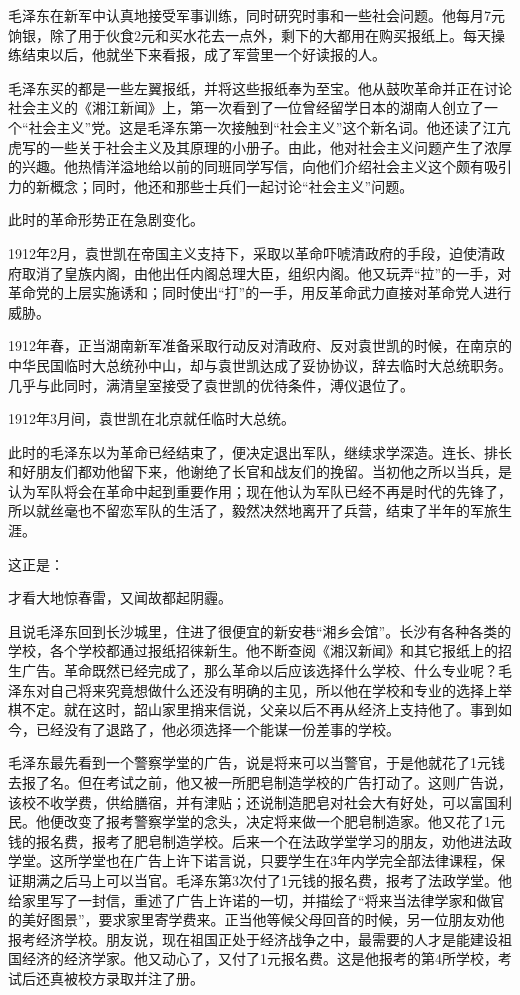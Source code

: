 \documentclass[../../dazhuan.tex]{subfiles}
\begin{document}
毛泽东在新军中认真地接受军事训练，同时研究时事和一些社会问题。他每月7元饷银，除了用于伙食2元和买水花去一点外，剩下的大都用在购买报纸上。每天操练结束以后，他就坐下来看报，成了军营里一个好读报的人。

毛泽东买的都是一些左翼报纸，并将这些报纸奉为至宝。他从鼓吹革命并正在讨论社会主义的《湘江新闻》上，第一次看到了一位曾经留学日本的湖南人创立了一个“社会主义”党。这是毛泽东第一次接触到“社会主义”这个新名词。他还读了江亢虎写的一些关于社会主义及其原理的小册子。由此，他对社会主义问题产生了浓厚的兴趣。他热情洋溢地给以前的同班同学写信，向他们介绍社会主义这个颇有吸引力的新概念；同时，他还和那些士兵们一起讨论“社会主义”问题。

此时的革命形势正在急剧变化。

1912年2月，袁世凯在帝国主义支持下，采取以革命吓唬清政府的手段，迫使清政府取消了皇族内阁，由他出任内阁总理大臣，组织内阁。他又玩弄“拉”的一手，对革命党的上层实施诱和；同时使出“打”的一手，用反革命武力直接对革命党人进行威胁。

1912年春，正当湖南新军准备采取行动反对清政府、反对袁世凯的时候，在南京的中华民国临时大总统孙中山，却与袁世凯达成了妥协协议，辞去临时大总统职务。几乎与此同时，满清皇室接受了袁世凯的优待条件，溥仪退位了。

1912年3月间，袁世凯在北京就任临时大总统。

此时的毛泽东以为革命已经结束了，便决定退出军队，继续求学深造。连长、排长和好朋友们都劝他留下来，他谢绝了长官和战友们的挽留。当初他之所以当兵，是认为军队将会在革命中起到重要作用；现在他认为军队已经不再是时代的先锋了，所以就丝毫也不留恋军队的生活了，毅然决然地离开了兵营，结束了半年的军旅生涯。

这正是：\begin{xemph}才看大地惊春雷，又闻故都起阴霾。\end{xemph}


且说毛泽东回到长沙城里，住进了很便宜的新安巷“湘乡会馆”。长沙有各种各类的学校，各个学校都通过报纸招徕新生。他不断查阅《湘汉新闻》和其它报纸上的招生广告。革命既然已经完成了，那么革命以后应该选择什么学校、什么专业呢？毛泽东对自己将来究竟想做什么还没有明确的主见，所以他在学校和专业的选择上举棋不定。就在这时，韶山家里捎来信说，父亲以后不再从经济上支持他了。事到如今，已经没有了退路了，他必须选择一个能谋一份差事的学校。

毛泽东最先看到一个警察学堂的广告，说是将来可以当警官，于是他就花了1元钱去报了名。但在考试之前，他又被一所肥皂制造学校的广告打动了。这则广告说，该校不收学费，供给膳宿，并有津贴；还说制造肥皂对社会大有好处，可以富国利民。他便改变了报考警察学堂的念头，决定将来做一个肥皂制造家。他又花了1元钱的报名费，报考了肥皂制造学校。后来一个在法政学堂学习的朋友，劝他进法政学堂。这所学堂也在广告上许下诺言说，只要学生在3年内学完全部法律课程，保证期满之后马上可以当官。毛泽东第3次付了1元钱的报名费，报考了法政学堂。他给家里写了一封信，重述了广告上许诺的一切，并描绘了“将来当法律学家和做官的美好图景”，要求家里寄学费来。正当他等候父母回音的时候，另一位朋友劝他报考经济学校。朋友说，现在祖国正处于经济战争之中，最需要的人才是能建设祖国经济的经济学家。他又动心了，又付了1元报名费。这是他报考的第4所学校，考试后还真被校方录取并注了册。
\end{document}
